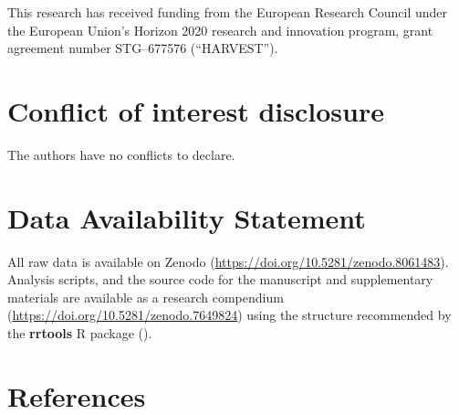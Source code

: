 \documentclass[
  11pt,
  leqno]{scrartcl}
\begin{document}
This research has received funding from the European Research Council
under the European Union's Horizon 2020 research and innovation program,
grant agreement number STG--677576 (``HARVEST'').

\section*{Conflict of interest
disclosure}\label{conflict-of-interest-disclosure}

The authors have no conflicts to declare.

\section*{Data Availability
Statement}\label{data-availability-statement}

All raw data is available on Zenodo
(\url{https://doi.org/10.5281/zenodo.8061483}). Analysis scripts, and
the source code for the manuscript and supplementary materials are
available as a research compendium
(\url{https://doi.org/10.5281/zenodo.7649824}) using the structure
recommended by the \textbf{rrtools} R package
().

\section*{References}\label{references}
\end{document}
